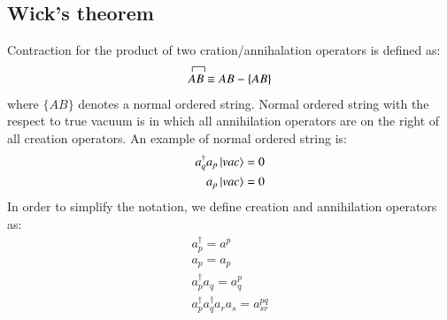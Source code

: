\documentclass[journal=jacsat]{achemso}
\numberwithin{equation}{section}
\begin{document}
\subsection{Wick's theorem} 
Contraction for the product of two cration/annihalation operators is defined as:
\begin{align}
\contraction{}{A}{B}{}
AB\equiv AB - \{AB\}
\end{align}
where $\{AB\}$ denotes a normal ordered string. Normal ordered string with the respect to true vacuum is in which all annihilation operators are on the right of all creation operators.
An example of normal ordered string is:
\begin{align}
a_{q}^{\dagger}a_{p}\ket{vac}=0\\
a_{p}\ket{vac}=0
\end{align}  
In order to simplify the notation, we define creation and annihilation operators as:
\begin{align}
a_{p}^{\dagger}=a^{p} \\
a_{p}=a_{p}\\
a_{p}^{\dagger}a_{q}=a_{q}^{p}\\
a_{p}^{\dagger}a_{q}^{\dagger}a_{r}a_{s}=a^{pq}_{sr}\\
\end{align} 
\end{document}

